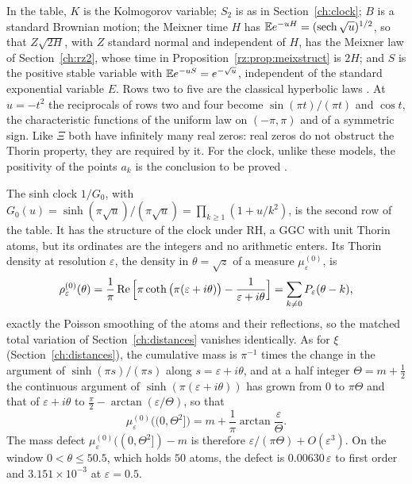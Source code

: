 In the table, $K$ is the Kolmogorov variable; $S_2$ is as in Section~\ref{ch:clock}; $B$ is a standard Brownian motion; the Meixner time $H$ has $\mathbb{E} e^{-uH}=(\operatorname{sech}\sqrt u)^{1/2}$, so that $Z\sqrt{2H}$, with $Z$ standard normal and independent of $H$, has the Meixner law of Section~\ref{ch:rz2}, whose time in Proposition~\ref{rz:prop:meixstruct} is $2H$; and $S$ is the positive stable variable with $\mathbb{E} e^{-uS}=e^{-\sqrt u}$, independent of the standard exponential variable $E$. Rows two to five are the classical hyperbolic laws \cite{BPY01}. At $u=-t^2$ the reciprocals of rows two and four become $\sin(\pi t)/(\pi t)$ and $\cos t$, the characteristic functions of the uniform law on $(-\pi,\pi)$ and of a symmetric sign. Like $\Xi$ both have infinitely many real zeros: real zeros do not obstruct the Thorin property, they are required by it. For the clock, unlike these models, the positivity of the points $a_k$ is the conclusion to be proved \cite[Section 10]{P17}.

The sinh clock $1/G_0$, with $G_0(u)=\sinh(\pi\sqrt u)/(\pi\sqrt u)=\prod_{k\ge1}(1+u/k^2)$, is the second row of the table. It has the structure of the clock under RH, a GGC with unit Thorin atoms, but its ordinates are the integers and no arithmetic enters. Its Thorin density at resolution $\varepsilon$, the density in $\theta=\sqrt z$ of a measure $\mu^{(0)}_\varepsilon$, is
\[
\rho^{(0)}_\varepsilon(\theta)=\frac1\pi\operatorname{Re}\Big[\pi\coth\big(\pi(\varepsilon+i\theta)\big)-\frac1{\varepsilon+i\theta}\Big]=\sum_{k\ne0}P_\varepsilon(\theta-k),
\]
exactly the Poisson smoothing of the atoms and their reflections, so the matched total variation of Section~\ref{ch:distances} vanishes identically. As for $\xi$ (Section~\ref{ch:distances}), the cumulative mass is $\pi^{-1}$ times the change in the argument of $\sinh(\pi s)/(\pi s)$ along $s=\varepsilon+i\theta$, and at a half integer $\Theta=m+\frac12$ the continuous argument of $\sinh(\pi(\varepsilon+i\theta))$ has grown from $0$ to $\pi\Theta$ and that of $\varepsilon+i\theta$ to $\frac\pi2-\arctan(\varepsilon/\Theta)$, so that
\[
\mu^{(0)}_\varepsilon\big((0,\Theta^2]\big)=m+\frac1\pi\arctan\frac\varepsilon\Theta .
\]
The mass defect $\mu^{(0)}_\varepsilon((0,\Theta^2])-m$ is therefore $\varepsilon/(\pi\Theta)+O(\varepsilon^3)$. On the window $0<\theta\le50.5$, which holds $50$ atoms, the defect is $0.00630\,\varepsilon$ to first order and $3.151\times10^{-3}$ at $\varepsilon=0.5$.

